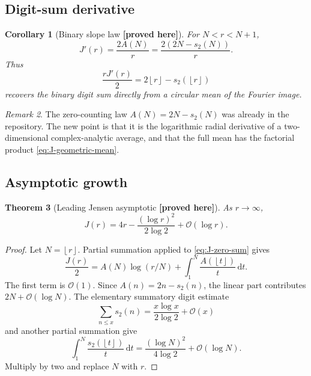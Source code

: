 \documentclass[11pt,oneside]{article}
\newtheorem{theorem}{Theorem}[section]
\newtheorem{corollary}[theorem]{Corollary}
\theoremstyle{definition}
\theoremstyle{remark}
\newtheorem{remark}[theorem]{Remark}
\newcommand{\dd}{\,\mathrm d}
\newcommand{\bigO}{\mathcal O}
\newcommand{\wt}{s_2}
\newcommand{\floor}[1]{\left\lfloor #1\right\rfloor}
\newcommand{\New}{\textcolor{amber}{\textbf{[proved here]}}}
\begin{document}
\subsection{Digit-sum derivative}

\begin{corollary}[Binary slope law \New]
For $N<r<N+1$,
\begin{equation}
 \boxed{\quad
 J'(r)=\frac{2A(N)}r
 =\frac{2(2N-\wt(N))}{r}.
 \quad}                                                  \label{eq:J-derivative}
\end{equation}
Thus
\begin{equation}
 \frac{rJ'(r)}2=2\floor r-\wt(\floor r)                  \label{eq:J-digit-recovery}
\end{equation}
recovers the binary digit sum directly from a circular mean of the Fourier image.
\end{corollary}

\begin{remark}
The zero-counting law $A(N)=2N-\wt(N)$ was already in the repository.  The new point is that
it is the logarithmic radial derivative of a two-dimensional complex-analytic average, and
that the full mean has the factorial product \eqref{eq:J-geometric-mean}.
\end{remark}

\subsection{Asymptotic growth}

\begin{theorem}[Leading Jensen asymptotic \New]
As $r\to\infty$,
\begin{equation}
 \boxed{\quad
 J(r)=4r-\frac{(\log r)^2}{2\log2}+\bigO(\log r).
 \quad}                                                  \label{eq:J-asymptotic}
\end{equation}
\end{theorem}

\begin{proof}
Let $N=\floor r$.  Partial summation applied to \eqref{eq:J-zero-sum} gives
\[
 \frac{J(r)}2=A(N)\log(r/N)
 +\int_1^N\frac{A(\floor t)}{t}\dd t.
\]
The first term is $\bigO(1)$.  Since
$A(n)=2n-\wt(n)$, the linear part contributes $2N+\bigO(\log N)$.  The elementary
summatory digit estimate
\[
 \sum_{n\le x}\wt(n)=\frac{x\log x}{2\log2}+\bigO(x)
\]
and another partial summation give
\[
 \int_1^N\frac{\wt(\floor t)}{t}\dd t
 =\frac{(\log N)^2}{4\log2}+\bigO(\log N).
\]
Multiply by two and replace $N$ with $r$.
\end{proof}
\end{document}
